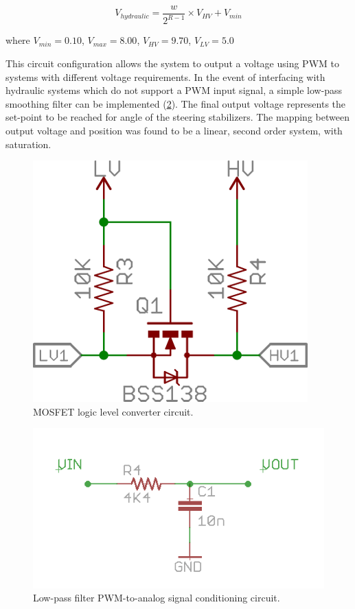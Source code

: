 \documentclass[authoryear]{elsarticle}
\begin{document}
\begin{equation}
  V_{hydraulic} = \frac{w}{2^{R-1}} \times V_{HV} + V_{min}
  \label{eq:v_out}
\end{equation}
\begin{flushleft}
where $V_{min}=0.10$, $V_{max}=8.00$, $V_{HV}=9.70$, $V_{LV}=5.0$
\end{flushleft}

\begin{flushleft}
This circuit configuration allows the system to output a voltage using PWM to systems
with different voltage requirements. In the event of interfacing with
hydraulic systems which do not support a PWM input signal, a simple
low-pass smoothing filter can be implemented (\ref{fig:lowpass}). The
final output voltage represents the set-point to be reached for angle of the
steering stabilizers. The mapping between output voltage and position was found
to be a linear, second order system, with saturation.
\end{flushleft}

\begin{figure}
  \centering
  \includegraphics[scale=0.3,natwidth=610,natheight=642]{mosfet.png}
  \caption{MOSFET logic level converter circuit.}
  \label{fig:mosfet}
\end{figure}

\begin{figure}
  \centering
  \includegraphics[scale=0.5,natwidth=400,natheight=400]{lowpass.png}
  \caption{Low-pass filter PWM-to-analog signal conditioning circuit.}
  \label{fig:lowpass}
\end{figure}
\end{document}
